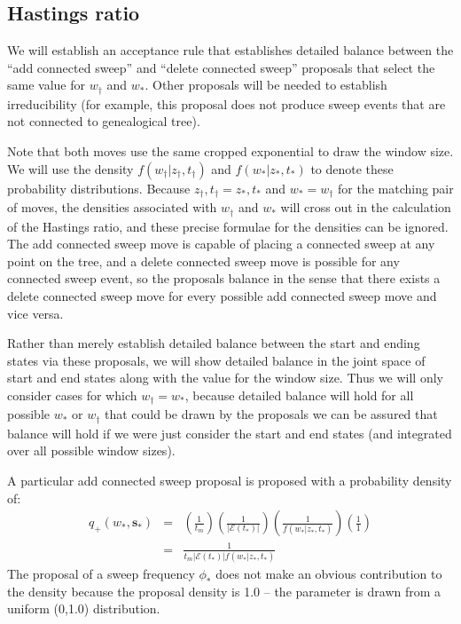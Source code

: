 \documentclass[letterpaper]{article}
\newcommand{\sweep}[1]{{\ensuremath{\mathbf{s}_{#1}}}}
\newcommand{\sweeptime}[1]{{\ensuremath{t_{#1}}}}
\newcommand{\sweepfreq}[1]{{\ensuremath{\phi_{#1}}}}
\newcommand{\sweeploc}[1]{{\ensuremath{z_{#1}}}}
\newcommand{\edgesAt}{{\ensuremath{\mathcal{E}}}}
\begin{document}
\subsection{Hastings ratio}
We will establish an acceptance rule that establishes detailed balance between the
``add connected sweep'' and ``delete connected sweep'' proposals that select the same value for $w_{\dag}$ and $w_{*}$.
Other proposals will be needed to establish irreducibility (for example, this proposal does not produce
sweep events that are not connected to genealogical tree).

Note that both moves use the same cropped exponential to draw the window size.
We will use the density $f(w_{\dag}| \sweeploc{\dag},\sweeptime{\dag})$ and $f(w_{*}| \sweeploc{*},\sweeptime{*})$ to denote these probability distributions.
Because $\sweeploc{\dag},\sweeptime{\dag}= \sweeploc{*},\sweeptime{*}$  and $w_* = w_{\dag}$ for the matching pair of moves, the densities associated with $w_{\dag}$ and $w_{*}$ will cross out in the calculation of the Hastings ratio, and these precise formulae for the densities can be ignored.
The add connected sweep move is capable of placing a connected sweep at any point on the tree, and a 
delete connected sweep move is possible for any connected sweep event, so the proposals balance in the sense
that there exists a delete connected sweep move for every possible add connected sweep move and vice versa.

Rather than merely establish detailed balance between the start and ending states via these proposals, we will show detailed balance in the joint space of start and end states along with the value for the window size. 
Thus we will only consider cases for which $w_{\dag} = w_{*}$, because detailed balance will hold for all possible $w_{*}$ or $w_{\dag}$ that could be drawn by the proposals we can be assured that balance will hold if we were just consider the start and end states (and integrated over all possible window sizes).

A particular add connected sweep proposal is proposed with a probability density of:
\begin{eqnarray}
	q_{+}(w_{*},\sweep{*}) & = & \left(\frac{1}{t_m}\right) \left(\frac{1}{|\edgesAt(\sweeptime{*})|}\right) \left(\frac{1}{f(w_{*}|\sweeploc{*},\sweeptime{*})}\right) \left(\frac{1}{1}\right) \\
	& = & \frac{1}{t_m|\edgesAt(\sweeptime{*})|f(w_{*}|\sweeploc{*},\sweeptime{*})}
\end{eqnarray}
The proposal of a sweep frequency $\sweepfreq{*}$ does not make an obvious contribution to the density because the proposal density is 1.0 -- the parameter is drawn from a uniform (0,1.0) distribution.
\end{document}
